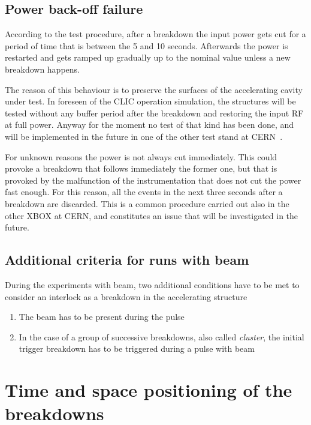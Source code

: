 \subsection{Power back-off failure}

According to the test procedure, after a breakdown the input power gets cut for a period of time that is between the 5 and 10 seconds. Afterwards the power is restarted and gets ramped up gradually up to the nominal value unless a new breakdown happens.

The reason of this behaviour is to preserve the surfaces of the accelerating cavity under test. In foreseen of the CLIC operation simulation, the structures will be tested without any buffer period after the breakdown and restoring the input RF at full power. Anyway for the moment no test of that kind has been done, and will be implemented in the future in one of the other test stand at CERN~\cite{Walter:PC}.

For unknown reasons the power is not always cut immediately. This could provoke a breakdown that follows immediately the former one, but that is provoked by the malfunction of the instrumentation that does not cut the power fast enough. For this reason, all the events in the next three seconds after a breakdown are discarded. This is a common procedure carried out also in the other XBOX at CERN, and constitutes an issue that will be investigated in the future. 


\subsection[Additional criteria for runs with beam]{Additional criteria for runs with beam}

During the experiments with beam, two additional conditions have to be met to consider an interlock as a breakdown in the accelerating structure
\begin{enumerate}
\item The beam has to be present during the pulse
\item In the case of a group of successive breakdowns, also called \textit{cluster}, the initial trigger breakdown has to be triggered during a pulse with beam
\end{enumerate}





\section[Time and space positioning of the breakdowns]{Time and space positioning of the breakdowns}

